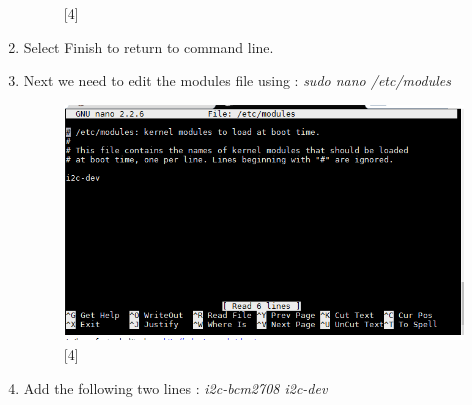\documentclass[a4paper,12pt,oneside]{book}
\begin{document}
\begin{enumerate}
\begin{figure}[H]
			\centering
			\caption{[4]}
		\end{figure}
		\item Select Finish to return to command line.
		\item Next we need to edit the modules file using : \newline \textit{sudo nano /etc/modules} 
		\begin{figure}[H]
			\includegraphics[scale=0.6]{i2c_7}
			\centering
			\caption{[4]}
		\end{figure}
		\item Add the following two lines : \newline \textit{i2c-bcm2708 \newline i2c-dev}
		

\end{enumerate}
\end{document}
